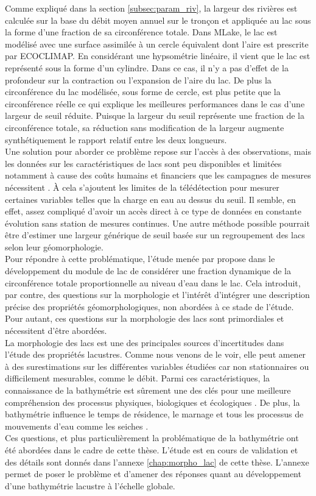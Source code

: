 Comme expliqué dans la section \ref{subsec:param_riv}, la largeur des rivières est calculée sur la base du débit moyen annuel sur le tronçon et appliquée au lac sous la forme d'une fraction de sa circonférence totale. Dans MLake, le lac est modélisé avec une surface assimilée à un cercle équivalent dont l'aire est prescrite par ECOCLIMAP. En considérant une hypsométrie linéaire, il vient que le lac est représenté sous la forme d'un cylindre. Dans ce cas, il n'y a pas d'effet de la profondeur sur la contraction ou l'expansion de l'aire du lac. De plus la circonférence du lac modélisée, sous forme de cercle, est plus petite que la circonférence réelle ce qui explique les meilleures performances dans le cas d'une largeur de seuil réduite. Puisque la largeur du seuil représente une fraction de la circonférence totale, sa réduction sans modification de la largeur augmente synthétiquement le rapport relatif entre les deux longueurs.\\
Une solution pour aborder ce problème repose sur l'accès à des observations, mais les données sur les caractéristiques de lacs sont peu disponibles et limitées notamment à cause des coûts humains et financiers que les campagnes de mesures nécessitent \citep{duan2013}. À cela s'ajoutent les limites de la télédétection pour mesurer certaines variables telles que la charge en eau au dessus du seuil. Il semble, en effet, assez compliqué d'avoir un accès direct à ce type de données en constante évolution sans station de mesures continues. Une autre méthode possible pourrait être d'estimer une largeur générique de seuil basée sur un regroupement des lacs selon leur géomorphologie.\\
Pour répondre à cette problématique, l'étude menée par \citet{bowling2010} propose dans le développement du module de lac de considérer une fraction dynamique de la circonférence totale proportionnelle  au niveau d'eau dans le lac. Cela introduit, par contre, des questions sur la morphologie et l'intérêt d'intégrer une description précise des propriétés géomorphologiques, non abordées à ce stade de l'étude. Pour autant, ces questions sur la morphologie des lacs sont primordiales et nécessitent d'être abordées.\\

La morphologie des lacs est une des principales sources d'incertitudes dans l'étude des propriétés lacustres. Comme nous venons de le voir, elle peut amener à des surestimations sur les différentes variables étudiées car non stationnaires ou difficilement mesurables, comme le débit. Parmi ces caractéristiques, la connaissance de la bathymétrie est sûrement une des clés pour une meilleure compréhension des processus physiques, biologiques et écologiques \citep{blais1995, yao2018}. De plus, la bathymétrie influence le temps de résidence, le marnage et tous les processus de mouvements d'eau comme les seiches \citep{fricker2000,bastviken2004}.\\
Ces questions, et plus particulièrement la problématique de la bathymétrie ont été abordées dans le cadre de cette thèse. L'étude est en cours de validation et des détails sont donnés dans l'annexe \ref{chap:morpho_lac} de cette thèse. L'annexe permet de poser le problème et d'amener des réponses quant au développement d'une bathymétrie lacustre à l'échelle globale.
\clearpage
